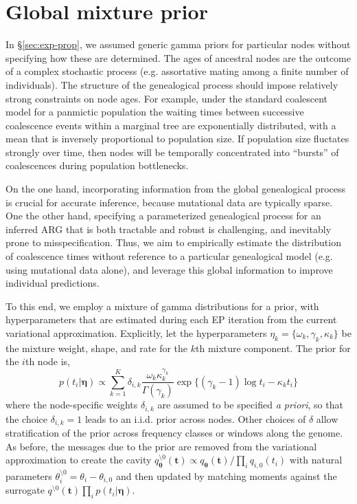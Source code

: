 \documentclass{article}
\begin{document}
\section{Global mixture prior}

In \S \ref{sec:exp-prop}, we assumed generic gamma priors for particular nodes without specifying how these are determined.
The ages of ancestral nodes are the outcome of a complex stochastic process 
(e.g. assortative mating among a finite number of individuals). 
The structure of the genealogical process should impose relatively strong constraints on node ages. 
For example, under the standard coalescent model for a panmictic population the waiting times between 
successive coalescence events within a marginal tree are exponentially distributed, 
with a mean that is inversely proportional to population size. 
If population size fluctates strongly over time, 
then nodes will be temporally concentrated into ``bursts'' of coalescences during population bottlenecks.

On the one hand, incorporating information from the global genealogical process is crucial for accurate inference, 
because mutational data are typically sparse. 
One the other hand, specifying a parameterized genealogical process for an inferred ARG that is both tractable and robust is challenging, and inevitably prone to misspecification. 
Thus, we aim to empirically estimate the distribution of coalescence times without reference to a particular genealogical model 
(e.g. using mutational data alone), 
and leverage this global information to improve individual predictions. 

To this end, we employ a mixture of gamma distributions for a prior, 
with hyperparameters that are estimated during each EP iteration from the current variational approximation. 
Explicitly, let the hyperparameters $\eta_k = \{ \omega_k, \gamma_k, \kappa_k \}$ 
be the mixture weight, shape, and rate for the $k$th mixture component. 
The prior for the $i$th node is,
\[
  p(t_i | \bm \eta) \propto \sum_{k=1}^K \delta_{i,k} \frac{\omega_k \kappa_k^{\gamma_k}}{\Gamma(\gamma_k)} \exp \{(\gamma_k - 1) \log t_i - \kappa_k t_i \}
\]
where the node-specific weights $\delta_{i,k}$ are assumed to be specified \emph{a priori}, 
so that the choice $\delta_{i,k} = 1$ leads to an i.i.d. prior across nodes. 
Other choices of $\delta$ allow stratification of the prior across frequency classes or windows along the genome. 
As before, the messages due to the prior are removed from the variational approximation to create the cavity 
$q_{\bm \theta}^{\setminus 0}(\bm t) \propto q_{\bm \theta}(\bm t) / \prod_{i} q_{i,0}(t_i)$ 
with natural parameters $\theta_i^{\setminus 0} = \theta_i - \theta_{i,0}$ 
and then updated by matching moments against the surrogate $q^{\setminus 0}(\bm t) \prod_{i} p(t_i | \bm \eta)$. 
\end{document}
